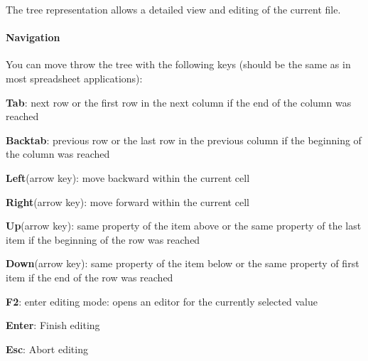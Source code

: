 \documentclass[a4paper,11pt]{report}
\begin{document}
\begin{figure}
\label{pic:tree}
\end{figure}


The tree representation allows a detailed view and editing of the current file. 

\paragraph{Navigation}
You can move throw the tree with the following keys (should be the same as in most spreadsheet applications):
\begin{trivlist}
	\leftskip=1cm
	\item[] \textbf{Tab}: next row or the first row in the next column if the end of the column was reached
	\item[] \textbf{Backtab}: previous row or the last row in the previous column if the beginning of the column was reached
	\item[] \textbf{Left}(arrow key): move backward within the current cell
	\item[] \textbf{Right}(arrow key): move forward within the current cell
	\item[] \textbf{Up}(arrow key): same property of the item above or the same property of the last item if the beginning of the row was reached
	\item[] \textbf{Down}(arrow key): same property of the item below or the same property of first item if the end of the row was reached
	\item[] \textbf{F2}: enter editing mode: opens an editor for the currently selected value
	\item[] \textbf{Enter}: Finish editing
	\item[] \textbf{Esc}: Abort editing
\end{trivlist}
\end{document}
